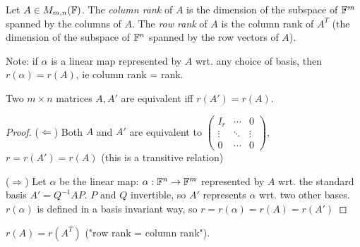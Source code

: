 \documentclass[a4paper]{article}
\begin{document}
\begin{defi}
	Let $ A \in M_{m,n}(\mathbb{F}) $. The \emph{column rank} of $ A $ is the dimension of the subspace of $ \mathbb{F}^{m} $ spanned by the columns of $ A $. The \emph{row rank} of $ A $ is the column rank of $ A^{T} $ (the dimension of the subspace of $ \mathbb{F}^{n} $ spanned by the row vectors of $ A $).
\end{defi}

Note: if $ \alpha $ is a linear map represented by $ A $ wrt. any choice of basis, then $ r(\alpha) = r(A) $, ie column rank = rank.

\begin{prop} 
	Two $ m \times n $ matrices $ A,A' $ are equivalent iff $ r(A') = r(A) $. 
\end{prop}

\begin{proof}
	 ($ \Leftarrow $) Both $ A $ and $ A' $ are equivalent to $ \begin{pmatrix}
	 I_{r} & \cdots & 0 \\
	 \vdots & \ddots & \vdots \\
	 0 & \cdots & 0  
	 \end{pmatrix} $, $ r = r(A') = r(A) $ (this is a transitive relation)
	 
	 ($ \Rightarrow $) Let $ \alpha $ be the linear map: $ \alpha : \mathbb{F}^{n}  \to \mathbb{F}^{m} $ represented by $ A $ wrt. the standard basis $ A' = Q^{-1} A P$. $ P $ and $ Q $ invertible, so $ A' $ represents $ \alpha $ wrt. two other bases. $ r(\alpha) $ is defined in a basis invariant way, so $ r = r(\alpha) = r(A) = r(A') $

\end{proof}



\begin{thm} 
	$ r(A) = r(A^{T}) $ ("row rank = column rank").
\end{thm}
\end{document}

